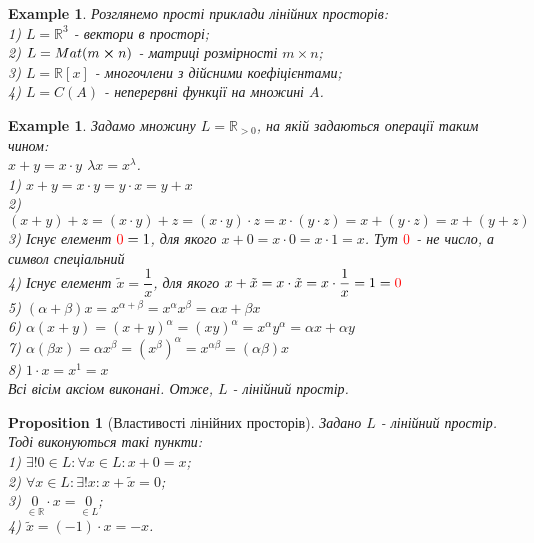 \documentclass[a4paper, 10pt]{article}
\theoremstyle{theoremdd}
\theoremstyle{theoremdd}
\theoremstyle{theoremdd}
\theoremstyle{theoremdd}
\newtheorem{example}[theorem]{Example}
\theoremstyle{theoremdd}
\newtheorem{proposition}[theorem]{Proposition}
\theoremstyle{theoremdd}
\theoremstyle{theoremdd}
\theoremstyle{theoremdd}
\begin{document}
	\begin{example}
	Розглянемо прості приклади лінійних просторів: \\
	1) $L = \mathbb{R}^3$ - вектори в просторі; \\
	2) $L = Mat(m \cross n)$ - матриці розмірності $m \times n$; \\
	3) $L = \mathbb{R}[x]$ - многочлени з дійсними коефіцієнтами; \\
	4) $L = C(A)$ - неперервні функції на множині $A$.
	\end{example}
	
	\begin{example}
	Задамо множину $L = \mathbb{R}_{> 0}$, на якій задаються операції таким чином:\\
	$x + y = x \cdot y$ \hspace{1cm} $\lambda x = x^\lambda$.\\
	1) $x+y = x \cdot y = y \cdot x = y + x$ \\
	2) $(x+y) + z = (x \cdot y) + z = (x \cdot y) \cdot z = x \cdot (y \cdot z) = x + (y \cdot z) = x + (y + z)$ \\
	3) Існує елемент $\textcolor{red}{0} = 1$, для якого $x + 0 = x \cdot 0 = x \cdot 1 = x$. Тут $\textcolor{red}{0}$ - не число, а символ спеціальний\\
	4) Існує елемент $\tilde{x} = \dfrac{1}{x}$, для якого $x + \tilde{x} = x \cdot \tilde{x} = x \cdot \dfrac{1}{x} = 1 = \textcolor{red}{0}$\\
	5) $(\alpha + \beta)x = x^{\alpha + \beta} = x^{\alpha} x^{\beta} = \alpha x + \beta x$ \\
	6) $\alpha (x+y) = (x+y)^\alpha = (xy)^{\alpha} = x^{\alpha} y^{\alpha} = \alpha x + \alpha y$ \\
	7) $\alpha (\beta x) = \alpha x^\beta = (x^\beta)^\alpha = x^{\alpha \beta} = (\alpha \beta) x$ \\
	8) $1 \cdot x = x^1 = x$\\
	Всі вісім аксіом виконані. Отже, $L$ - лінійний простір.
	\end{example}
	
	\begin{proposition}[Властивості лінійних просторів]
	Задано $L$ - лінійний простір. Тоді виконуються такі пункти:\\
	1) $\exists !0 \in L: \forall x \in L: x + 0 = x$;\\
	2) $\forall x \in L: \exists! x: x + \tilde{x} = 0$;\\
	3) $\underset{\in \mathbb{R}}{0} \cdot x = \underset{\in L}{0}$;\\
	4) $\tilde{x} = (-1) \cdot x = -x$.
	\end{proposition}
	
\end{document}
